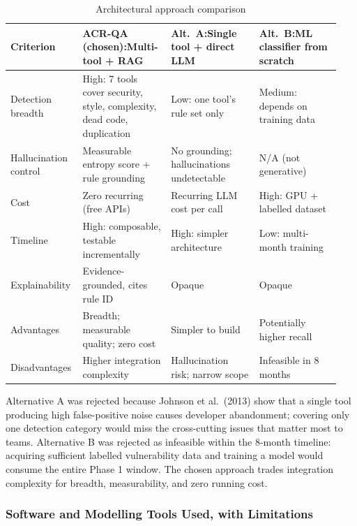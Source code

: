 \documentclass[12pt,a4paper]{article}
\begin{document}
\begin{table}[ht]
\centering
\caption{Architectural approach comparison}
\label{tab:approaches}
\small
\begin{tabular}{p{0.18\linewidth}p{0.26\linewidth}p{0.26\linewidth}p{0.24\linewidth}}
\toprule
\textbf{Criterion} &
\textbf{ACR-QA (chosen):\newline Multi-tool + RAG} &
\textbf{Alt.\ A:\newline Single tool + direct LLM} &
\textbf{Alt.\ B:\newline ML classifier from scratch} \\
\midrule
Detection breadth & High: 7 tools cover security, style, complexity, dead code, duplication
  & Low: one tool's rule set only
  & Medium: depends on training data \\
Hallucination control & Measurable entropy score + rule grounding
  & No grounding; hallucinations undetectable
  & N/A (not generative) \\
Cost & Zero recurring (free APIs)
  & Recurring LLM cost per call
  & High: GPU + labelled dataset \\
Timeline & High: composable, testable incrementally
  & High: simpler architecture
  & Low: multi-month training \\
Explainability & Evidence-grounded, cites rule ID
  & Opaque
  & Opaque \\
\midrule
Advantages & Breadth; measurable quality; zero cost
  & Simpler to build
  & Potentially higher recall \\
Disadvantages & Higher integration complexity
  & Hallucination risk; narrow scope
  & Infeasible in 8 months \\
\bottomrule
\end{tabular}
\end{table}

Alternative A was rejected because Johnson et al.\ (2013) show that a single tool
producing high false-positive noise causes developer abandonment; covering only one
detection category would miss the cross-cutting issues that matter most to teams.
Alternative B was rejected as infeasible within the 8-month timeline: acquiring
sufficient labelled vulnerability data and training a model would consume the entire
Phase 1 window.  The chosen approach trades integration complexity for breadth,
measurability, and zero running cost.

\subsubsection{Software and Modelling Tools Used, with Limitations}
\end{document}
